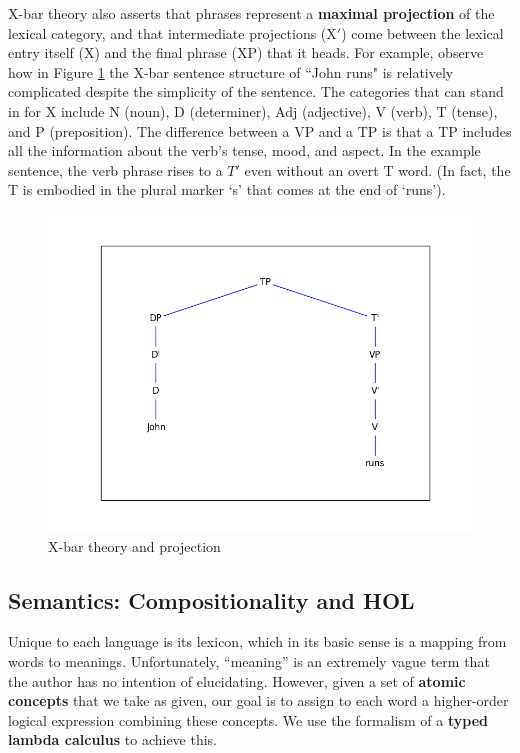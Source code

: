\documentclass[11pt, oneside]{article}      %
\begin{document}
X-bar theory also asserts that phrases represent a \textbf{maximal projection} of the lexical category, and that intermediate projections  (X$'$) come between the lexical entry itself (X) and the final phrase (XP) that it heads.  For example, observe how in Figure \ref{john_runs} the X-bar sentence structure of ``John runs" is relatively complicated despite the simplicity of the sentence.  The categories that can stand in for X include N (noun), D (determiner), Adj (adjective), V (verb), T (tense), and P (preposition).  The difference between a VP and a TP is that a TP includes all the information about the verb's tense, mood, and aspect.  In the example sentence, the verb phrase rises to a $T'$ even without an overt T word.  (In fact, the T is embodied in the plural marker `s' that comes at the end of `runs').

\begin{figure}[h] 
\centerline{\includegraphics[scale=.6]{runs_eng_1.png}}
\caption{X-bar theory and projection} \label{john_runs}
\end{figure}

\subsection{Semantics: Compositionality and HOL} \label{compositionality}

Unique to each language is its lexicon, which in its basic sense is a mapping from words to meanings.  Unfortunately, ``meaning'' is an extremely vague term that the author has no intention of elucidating.  However, given a set of \textbf{atomic concepts} that we take as given, our goal is to assign to each word a higher-order logical expression combining these concepts.  We use the formalism of a \textbf{typed lambda calculus} to achieve this.  
\end{document}
